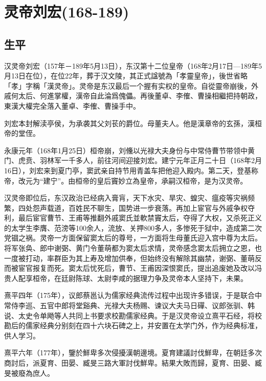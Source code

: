 
\section{灵帝刘宏\tiny(168-189)}

\subsection{生平}

汉灵帝刘宏（157年－189年5月13日），东汉第十二位皇帝（168年2月17日—189年5月13日在位），在位22年，葬于汉文陵，其正式諡號為「孝靈皇帝」，後世省略「孝」字稱「漢灵帝」。灵帝是东汉最后一个握有实权的皇帝。自從靈帝崩後，外戚何太后、何進掌權，漢帝自此淪爲傀儡。再後董卓、李傕、曹操相繼把持朝政，東漢大權完全落入董卓、李傕、曹操手中。

刘宏本封解渎亭侯，为承袭其父刘苌的爵位。母董夫人。他是漢章帝的玄孫，漢桓帝的堂侄。

永康元年（168年1月25日）桓帝崩，刘儵以光禄大夫身份与中常侍曹节带领中黄门、虎贲、羽林军一千多人，前往河间迎接刘宏。建宁元年正月二十日（168年2月16日），刘宏来到夏门亭，窦武亲自持节用青盖车把他迎入殿内。第二天，登基称帝，改元为“建宁”。由桓帝的皇后竇妙立為皇帝，承嗣汉桓帝，是为汉灵帝。　

汉灵帝即位后，东汉政治已经病入膏肓，天下水灾、旱灾、蝗灾、瘟疫等灾祸频繁，四处怨声载道，百姓民不聊生，国势进一步衰落。再加上宦官与外戚争权夺利，最后宦官曹节、王甫等推翻外戚窦氏並軟禁竇太后，夺得了大权，又杀死正义的太学生李膺、范滂等100余人，流放、关押800多人，多惨死于狱中，造成第二次党锢之祸。灵帝一方面保留窦太后的尊号，一方面将生母董氏迎入宫中尊为太后。将军张奂、郎中谢弼、黄门令董萌都为窦太后求情，灵帝感念窦太后拥立之恩，也一度被打动，率群臣为其上寿及增加供奉，但始终没有解除其幽禁，谢弼、董萌反而被宦官报复而死。窦太后忧死后，曹节、王甫因深恨窦氏，提出追废她及改以冯贵人配享桓帝，在廷尉陈球、太尉李咸的据理力争及灵帝本人坚持下，未果。

熹平四年（175年），议郎蔡邕认为儒家经典流传过程中出现许多错误，于是联合中常侍李巡、五官中郎将堂谿典、光禄大夫杨赐、谏议大夫马日磾、议郎张驯、韩说、太史令单飏等人共同上书要求校勘儒家经典。于是汉灵帝设立熹平石经，将校勘后的儒家经典分别刻在四十六块石碑之上，并安置在太学门外，作为经典标准，供人学习。

熹平六年（177年），鑒於鮮卑多次侵擾漢朝邊境。夏育建議討伐鮮卑，在朝廷多次商討后，派夏育、田晏、臧旻三路大軍討伐鮮卑。結果大敗而歸，夏育、田晏、臧旻被廢為庶人。

